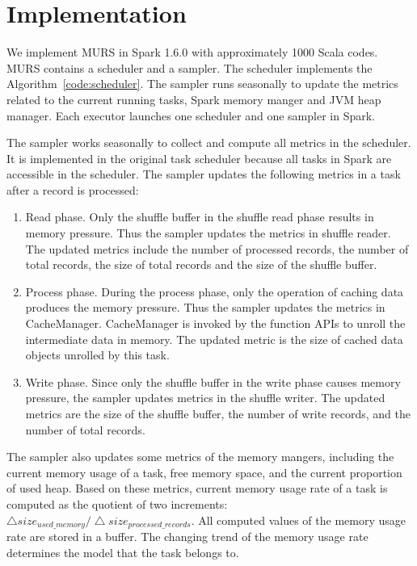 \section{Implementation}

We implement MURS in Spark 1.6.0 with approximately 1000 Scala codes. MURS contains a scheduler and a sampler. The scheduler implements the Algorithm~\ref{code:scheduler}. The sampler runs seasonally to update the metrics related to the current running tasks, Spark memory manger and JVM heap manager. Each executor launches one scheduler and one sampler in Spark.

The sampler works seasonally to collect and compute all metrics in the scheduler. It is implemented in the original task scheduler because all tasks in Spark are accessible in the scheduler. The sampler updates the following metrics in a task after a record is processed:

\begin{enumerate}

\item Read phase. Only the shuffle buffer in the shuffle read phase results in memory pressure. Thus the sampler updates the metrics in shuffle reader. The updated metrics include the number of processed records, the number of total records, the size of total records and the size of the shuffle buffer.

\item Process phase. During the process phase, only the operation of caching data produces the memory pressure. Thus the sampler updates the metrics in {\ttfamily \small CacheManager}. {\ttfamily \small CacheManager} is invoked by the function APIs to unroll the intermediate data in memory. The updated metric is the size of cached data objects unrolled by this task.

\item Write phase. Since only the shuffle buffer in the write phase causes memory pressure, the sampler updates metrics in the shuffle writer. The updated metrics are the size of the shuffle buffer, the number of write records, and the number of total records. 

\end{enumerate}

The sampler also updates some metrics of the memory mangers, including the current memory usage of a task, free memory space, and the current proportion of used heap. Based on these metrics, current memory usage rate of a task is computed as the quotient of two increments: $\bigtriangleup size_{used\_memory} / \bigtriangleup size_{processed\_records}$. All computed values of the memory usage rate are stored in a buffer. The changing trend of the memory usage rate determines the model that the task belongs to.

